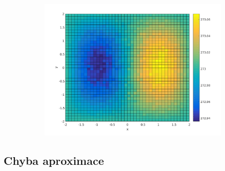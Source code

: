 \begin{frame}
\begin{figure}
\begin{subfigure}[t]{0.5\textwidth}
    \end{subfigure}%
    ~ 
    \begin{subfigure}[t]{0.5\textwidth}
        \centering
        \includegraphics[width=0.75\linewidth]{../../results/simulations/100000/solution_2D/solution_2D_sim100000_step01_time250_boundary2.pdf}
    \end{subfigure}
\end{figure}
\end{frame}

\subsection{Chyba aproximace}

